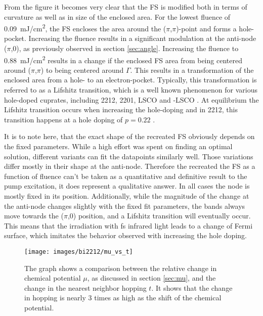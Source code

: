 From the figure it becomes very clear that the FS is modified both in terms of curvature as well as in size of the enclosed area.
For the lowest fluence of \qty{0.09}{\milli\joule/\centi\meter\squared}, the FS encloses the area around the ($\pi$,$\pi$)-point and forms a hole-pocket.
Increasing the fluence results in a significant modulation at the anti-node ($\pi$,0), as previously observed in section \ref{sec:angle}.
Increasing the fluence to  \qty{0.88}{\milli\joule/\centi\meter\squared} results in a change if the enclosed FS area from being centered around ($\pi$,$\pi$) to being centered around $\Gamma$.
This results in a transformation of the enclosed area from a hole- to an electron-pocket.
Typically, this transformation is referred to as a Lifshitz transition, which is a well known phenomenon for various hole-doped cuprates, including 2212, 2201, LSCO and -LSCO \cite{kaminski_change_2006,matt_electron_2015,ding_disappearance_2019,kondo_hole-concentration_2004}.
At equilibrium the Lifshitz transition occurs when increasing the hole-doping and in 2212, this transition happens at a hole doping of $p=0.22$ \cite{kaminski_change_2006}.

It is to note here, that the exact shape of the recreated FS obviously depends on the fixed parameters.
While a high effort was spent on finding an optimal solution, different variants can fit the datapoints similarly well.
Those variations differ mostly in their shape at the anti-node.
Therefore the recreated the FS as a function of fluence can't be taken as a quantitative and definitive result to the pump excitation, it does represent a qualitative answer.
In all cases the node is mostly fixed in its position.
Additionally, while the magnitude of the change at the anti-node changes slightly with the fixed fit parameters, the bands always move towards the ($\pi$,0) position, and a Lifshitz transition will eventually occur.
This means that the irradiation with \unit{\femto\second} infrared light leads to a change of Fermi surface, which imitates the behavior observed with increasing the hole doping. 

\begin{figure}
	\centering
	\texttt{[image: images/bi2212/mu\_vs\_t]}
	\caption{The graph shows a comparison between the relative change in chemical potential $\mu$, as discussed in section \ref{sec:mu}, and the change in the nearest neighbor hopping $t$. It shows that the change in hopping is nearly 3 times as high as the shift of the chemical potential.}
	\label{fig:mu_t}
\end{figure}


